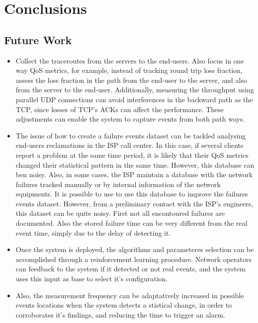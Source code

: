 \chapter{Conclusions}
\label{chap:conclusion}

\section{Future Work}

\begin{itemize}
\item
Collect the traceroutes from the servers to the end-users.
Also focus in one way QoS metrics, for example,
instead of tracking round trip loss fraction,
assess the loss fraction in the path from the end-user to the server, and also
from the server to the end-user.
Additionally, measuring the throughput using parallel UDP connections can avoid
interferences in the backward path as the TCP, since losses of TCP's ACKs can
affect the performance.
These adjustments can enable the system to capture events from both path ways.

\item
The issue of how to create a failure events dataset can be tackled analysing
end-users reclamations in the ISP call center. In this case, if several clients
report a problem at the same time period, it is likely that their QoS metrics
changed their statistical pattern in the same time. However, this database can
ben noisy. Also, in some cases, the ISP maintain a database with the network
failures tracked manually or by internal information of the network equipments.
It is possible to use to use this database to improve the failures events
dataset. However, from a preliminary contact with the ISP's engineers, this
dataset can be quite noisy. First not all encontoured failures are documented.
Also the stored failure time can be very different from the real event time,
simply due to the delay of detecting it.

\item
Once the system is deployed, the algorithms and parameteres selection can be
accomplished through a reinforcement learning procedure. Network operators can
feedback to the system if it detected or not real events, and the system uses
this input as base to select it's configuration.

\item
Also, the measurement frequency can be adaptatively increased in possible
events locations when the system
detects a stistical change, in order to corroborates it's findings, and
reducing the time to trigger an alarm.


\end{itemize}
